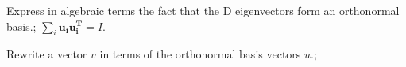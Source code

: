 \documentclass{article}
\begin{document}
Express in algebraic terms the fact that the D eigenvectors form an orthonormal basis.; $\sum_i\mathbf{u_{i}u_{i}^T}=I$.

Rewrite a vector $v$ in terms of the orthonormal basis vectors $u$.; \begin{itemize}
	\item $\mathbf{v}=(\sum_i \mathbf{u_{(i)}u_{(i)}^T})\mathbf{v}$
	\item $=\sum_i (\mathbf{u_{(i)}^Tv)u_{(i)}$
	\item $=\sum_i v_{(i)}\mathbf{u_{(i)}}$
\end{itemize}
\end{document}
